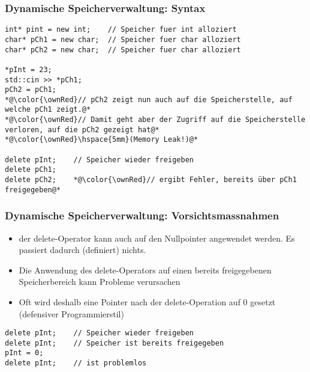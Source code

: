 \subsubsection{Dynamische Speicherverwaltung: Syntax\hfill}
\label{sec:Dynamische Speicherverwaltung: Syntax}
\noindent
\begin{minipage}{\linewidth}
\begin{lstlisting}
int* pint = new int;	// Speicher fuer int alloziert
char* pCh1 = new char;	// Speicher fuer char alloziert
char* pCh2 = new char;	// Speicher fuer char alloziert

*pInt = 23;
std::cin >> *pCh1;
pCh2 = pCh1;
*@\color{\ownRed}// pCh2 zeigt nun auch auf die Speicherstelle, auf welche pCh1 zeigt.@*
*@\color{\ownRed}// Damit geht aber der Zugriff auf die Speicherstelle verloren, auf die pCh2 gezeigt hat@*
*@\color{\ownRed}\hspace{5mm}(Memory Leak!)@*

delete pInt;	// Speicher wieder freigeben
delete pCh1;
delete pCh2;	*@\color{\ownRed}// ergibt Fehler, bereits über pCh1 freigegeben@*
\end{lstlisting}
\end{minipage}

\subsubsection{Dynamische Speicherverwaltung: Vorsichtsmassnahmen\hfill}
\label{sec:Dynamische Speicherverwaltung: Vorsichtsmassnahmen}
\begin{itemize}
	\item der delete-Operator kann auch auf den Nullpointer angewendet werden. Es passiert dadurch (definiert) nichts.
	\item Die Anwendung des delete-Operators auf einen  bereits freigegebenen Speicherbereich kann Probleme verursachen
	\item Oft wird deshalb eine Pointer nach der delete-Operation auf 0 gesetzt (defensiver Programmierstil)
\end{itemize}
\noindent
\begin{minipage}{\linewidth}
\begin{lstlisting}
delete pInt;	// Speicher wieder freigeben
delete pInt;	// Speicher ist bereits freigegeben
pInt = 0;
delete pInt;	// ist problemlos
\end{lstlisting}
\end{minipage}

